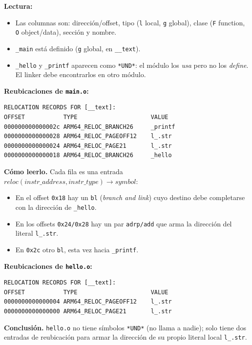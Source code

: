 \documentclass[11pt,a4paper]{article}
\begin{document}
\textbf{Lectura:}
\begin{itemize}[leftmargin=*]
    \item Las columnas son: dirección/offset, tipo (\texttt{l} local,
        \texttt{g} global), clase (\texttt{F} function, \texttt{O}
        object/data), sección y nombre.
    \item \texttt{\_main} está definido (\texttt{g} global, en
        \texttt{\_\_text}).
    \item \texttt{\_hello} y \texttt{\_printf} aparecen como
        \texttt{*UND*}: el módulo los \emph{usa} pero no los
        \emph{define}. El linker debe encontrarlos en otro módulo.
\end{itemize}

\textbf{Reubicaciones de \texttt{main.o}:}

\begin{lstlisting}[style=asmstyle]
RELOCATION RECORDS FOR [__text]:
OFFSET           TYPE                     VALUE
000000000000002c ARM64_RELOC_BRANCH26     _printf
0000000000000028 ARM64_RELOC_PAGEOFF12    l_.str
0000000000000024 ARM64_RELOC_PAGE21       l_.str
0000000000000018 ARM64_RELOC_BRANCH26     _hello
\end{lstlisting}

\textbf{Cómo leerlo.} Cada fila es una entrada
$reloc(instr\_address, instr\_type) \to symbol$:

\begin{itemize}[leftmargin=*, itemsep=0pt]
    \item En el offset \texttt{0x18} hay un \texttt{bl} (\emph{branch
        and link}) cuyo destino debe completarse con la dirección de
        \texttt{\_hello}.
    \item En los offsets \texttt{0x24/0x28} hay un par
        \texttt{adrp/add} que arma la dirección del literal
        \texttt{l\_.str}.
    \item En \texttt{0x2c} otro \texttt{bl}, esta vez hacia
        \texttt{\_printf}.
\end{itemize}

\textbf{Reubicaciones de \texttt{hello.o}:}

\begin{lstlisting}[style=asmstyle]
RELOCATION RECORDS FOR [__text]:
OFFSET           TYPE                     VALUE
0000000000000004 ARM64_RELOC_PAGEOFF12    l_.str
0000000000000000 ARM64_RELOC_PAGE21       l_.str
\end{lstlisting}

\textbf{Conclusión.} \texttt{hello.o} no tiene símbolos \texttt{*UND*}
(no llama a nadie); solo tiene dos entradas de reubicación para armar
la dirección de su propio literal local \texttt{l\_.str}.
\end{document}
